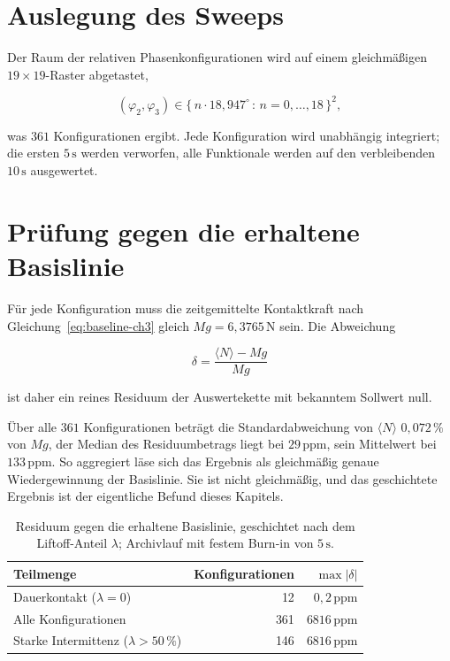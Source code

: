 \documentclass[12pt,a4paper]{report}
\begin{document}
\section{Auslegung des Sweeps}

Der Raum der relativen Phasenkonfigurationen wird auf einem gleichmäßigen
$19\times19$-Raster abgetastet,

\begin{equation}
  (\varphi_2, \varphi_3) \in
  \bigl\{\, n \cdot 18{,}947^\circ \,:\, n = 0,\dots,18 \,\bigr\}^{2},
  \label{eq:grid}
\end{equation}

was $361$ Konfigurationen ergibt. Jede Konfiguration wird unabhängig
integriert; die ersten $5\,\mathrm{s}$ werden verworfen, alle Funktionale
werden auf den verbleibenden $10\,\mathrm{s}$ ausgewertet.

\section{Prüfung gegen die erhaltene Basislinie}
\label{sec:track1-sim}

Für jede Konfiguration muss die zeitgemittelte Kontaktkraft nach
Gleichung~\eqref{eq:baseline-ch3} gleich $Mg = 6{,}3765\,\mathrm{N}$
sein. Die Abweichung

\begin{equation}
  \delta = \frac{\langle N \rangle - Mg}{Mg}
  \label{eq:residual-def}
\end{equation}

ist daher ein reines Residuum der Auswertekette mit bekanntem Sollwert
null.

Über alle $361$ Konfigurationen beträgt die Standardabweichung von
$\langle N \rangle$ $0{,}072\,\%$ von $Mg$, der Median des
Residuumbetrags liegt bei $29\,\mathrm{ppm}$, sein Mittelwert bei
$133\,\mathrm{ppm}$. So aggregiert läse sich das
Ergebnis als gleichmäßig genaue Wiedergewinnung der Basislinie. Sie ist
nicht gleichmäßig, und das geschichtete Ergebnis ist der eigentliche
Befund dieses Kapitels.

\begin{table}[htbp]
  \centering
  \begin{tabular}{lrr}
    \hline
    Teilmenge & Konfigurationen & $\max |\delta|$ \\
    \hline
    Dauerkontakt ($\lambda = 0$)              & 12  & $0{,}2\,\mathrm{ppm}$ \\
    Alle Konfigurationen                      & 361 & $6816\,\mathrm{ppm}$ \\
    Starke Intermittenz ($\lambda > 50\,\%$)  & 146 & $6816\,\mathrm{ppm}$ \\
    \hline
  \end{tabular}
  \caption{Residuum gegen die erhaltene Basislinie, geschichtet nach dem
  Liftoff-Anteil $\lambda$; Archivlauf mit festem Burn-in von
  $5\,\mathrm{s}$.}
  \label{tab:residual-strat}
\end{table}
\end{document}

